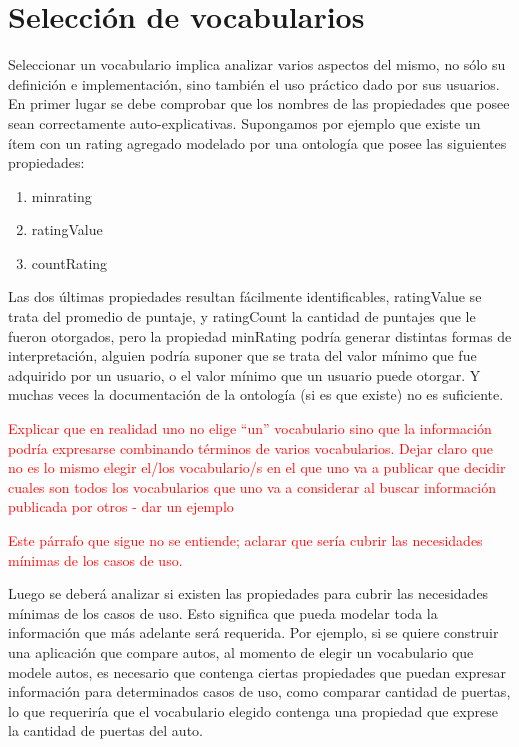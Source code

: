 \section{Selección de vocabularios}

Seleccionar un vocabulario implica analizar varios aspectos del mismo, no sólo su definición e implementación, sino también el uso práctico dado por sus usuarios. 
En primer lugar se debe comprobar que los nombres de las propiedades que posee sean correctamente auto-explicativas. Supongamos por ejemplo que existe un ítem con un rating agregado modelado por una ontología que posee las siguientes propiedades:

\begin{enumerate}
\item minrating
\item ratingValue
\item countRating
\end{enumerate}


Las dos últimas propiedades resultan fácilmente identificables, ratingValue se trata del promedio de puntaje, y ratingCount 
la cantidad de puntajes que le fueron otorgados, pero la propiedad minRating podría generar distintas formas de interpretación, 
alguien podría suponer que se trata del valor mínimo que fue adquirido por un usuario, o el valor mínimo que un usuario puede 
otorgar. Y muchas veces la documentación de la ontología (si es que existe) no es suficiente.

\begin{framed}
\textcolor{red}{Explicar que en realidad uno no elige ``un'' vocabulario sino que la información podría expresarse combinando términos de varios vocabularios. Dejar claro que no es lo mismo elegir el/los vocabulario/s en el que uno va a publicar que decidir cuales son todos los vocabularios que uno va a considerar al buscar información publicada por otros - dar un ejemplo}
\end{framed}

\begin{framed}
\textcolor{red}{Este párrafo que sigue no se entiende; aclarar que sería cubrir las necesidades mínimas de los casos de uso.}
\end{framed}
Luego se deberá analizar si existen las propiedades para cubrir las necesidades mínimas de los casos de uso. Esto significa que pueda modelar 
toda la información que más adelante será requerida. Por ejemplo, si se quiere construir una aplicación que compare autos, al momento 
de elegir un vocabulario que modele autos, es necesario que contenga ciertas propiedades que puedan expresar información  para determinados 
casos de uso, como comparar cantidad de puertas, lo que requeriría que el vocabulario elegido contenga una propiedad que exprese la cantidad 
de puertas del auto.

